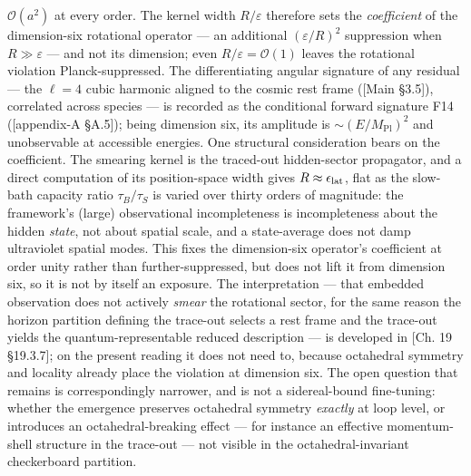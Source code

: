 \documentclass[
]{article}
\begin{document}
\(\mathcal{O}(a^2)\) at every order. The kernel width \(R/\varepsilon\)
therefore sets the \emph{coefficient} of the dimension-six rotational
operator --- an additional \((\varepsilon/R)^2\) suppression when
\(R \gg \varepsilon\) --- and not its dimension; even
\(R/\varepsilon = \mathcal{O}(1)\) leaves the rotational violation
Planck-suppressed. The differentiating angular signature of any residual
--- the \(\ell=4\) cubic harmonic aligned to the cosmic rest frame
({[}Main §3.5{]}), correlated across species --- is recorded as the
conditional forward signature F14 ({[}appendix-A §A.5{]}); being
dimension six, its amplitude is \(\sim(E/M_{\text{Pl}})^2\) and
unobservable at accessible energies. One structural consideration bears
on the coefficient. The smearing kernel is the traced-out hidden-sector
propagator, and a direct computation of its position-space width gives
\(R \approx \epsilon_{\rm lat}\), flat as the slow-bath capacity ratio
\(\tau_B/\tau_S\) is varied over thirty orders of magnitude: the
framework's (large) observational incompleteness is incompleteness about
the hidden \emph{state}, not about spatial scale, and a state-average
does not damp ultraviolet spatial modes. This fixes the dimension-six
operator's coefficient at order unity rather than further-suppressed,
but does not lift it from dimension six, so it is not by itself an
exposure. The interpretation --- that embedded observation does not
actively \emph{smear} the rotational sector, for the same reason the
horizon partition defining the trace-out selects a rest frame and the
trace-out yields the quantum-representable reduced description --- is
developed in {[}Ch. 19 §19.3.7{]}; on the present reading it does not
need to, because octahedral symmetry and locality already place the
violation at dimension six. The open question that remains is
correspondingly narrower, and is not a sidereal-bound fine-tuning:
whether the emergence preserves octahedral symmetry \emph{exactly} at
loop level, or introduces an octahedral-breaking effect --- for instance
an effective momentum-shell structure in the trace-out --- not visible
in the octahedral-invariant checkerboard partition.
\end{document}
